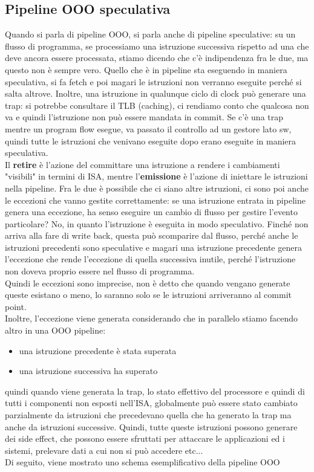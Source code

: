 \documentclass[14pt]{article}
\begin{document}
\subsection{Pipeline OOO speculativa}
Quando si parla di pipeline OOO, si parla anche di pipeline speculative: su un flusso di programma, se processiamo una istruzione successiva rispetto ad una che deve ancora essere processata, stiamo dicendo che c'è indipendenza fra le due, ma questo non è sempre vero. Quello che è in pipeline sta eseguendo in maniera speculativa, si fa fetch e poi magari le istruzioni non verranno eseguite perché si salta altrove. Inoltre, una istruzione in qualunque ciclo di clock può generare una trap: si potrebbe consultare il TLB (caching), ci rendiamo conto che qualcosa non va e quindi l'istruzione non può essere mandata in commit. Se c'è una trap mentre un program flow esegue, va passato il controllo ad un gestore lato sw, quindi tutte le istruzioni che venivano eseguite dopo erano eseguite in maniera speculativa.\\ Il \textbf{retire} è l'azione del committare una istruzione a rendere i cambiamenti "visibili" in termini di ISA, mentre l'\textbf{emissione} è l'azione di iniettare le istruzioni nella pipeline. Fra le due è possibile che ci siano altre istruzioni, ci sono poi anche le eccezioni che vanno gestite correttamente: se una istruzione entrata in pipeline genera una eccezione, ha senso eseguire un cambio di flusso per gestire l'evento particolare? No, in quanto l'istruzione è eseguita in modo speculativo. Finché non arriva alla fare di write back, questa può scomparire dal flusso, perché anche le istruzioni precedenti sono speculative e magari una istruzione precedente genera l'eccezione che rende l'eccezione di quella successiva inutile, perché l'istruzione non doveva proprio essere nel flusso di programma.\\ Quindi le eccezioni sono imprecise, non è detto che quando vengano generate queste esistano o meno, lo saranno solo se le istruzioni arriveranno al commit point.\\ Inoltre, l'eccezione viene generata considerando che in parallelo stiamo facendo altro in una OOO pipeline:
\begin{itemize}
\item una istruzione precedente è stata superata
\item una istruzione successiva ha superato
\end{itemize}
quindi quando viene generata la trap, lo stato effettivo del processore e quindi di tutti i componenti non esposti nell'ISA, globalmente può essere stato cambiato parzialmente da istruzioni che precedevano quella che ha generato la trap ma anche da istruzioni successive. Quindi, tutte queste istruzioni possono generare dei side effect, che possono essere sfruttati per attaccare le applicazioni ed i sistemi, prelevare dati a cui non si può accedere etc...\\ Di seguito, viene mostrato uno schema esemplificativo della pipeline OOO\\\\
\end{document}
